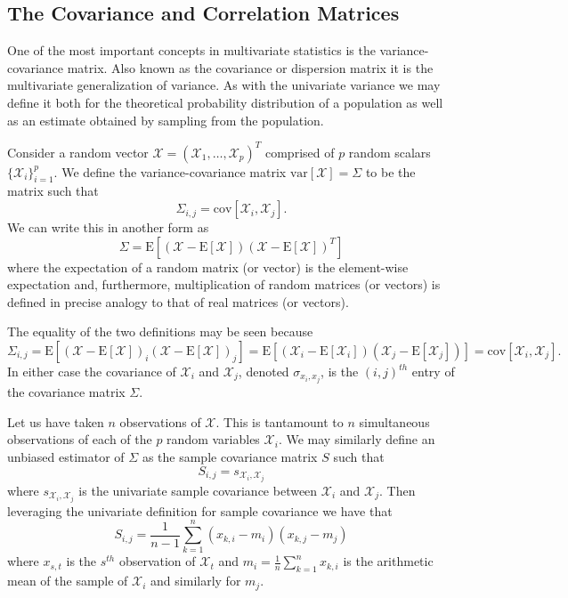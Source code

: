\documentclass{book}
\newcommand{\bs}[1]{\boldsymbol{#1}}
\newcommand{\rv}[1]{\bs{\mathscr{#1}}}
\newcommand{\e}[1]{\text{E}\left[#1\right]}
\newcommand{\cov}[2]{\text{cov}\left[#1,#2\right]}
\begin{document}
\subsection{The Covariance and Correlation Matrices}

One of the most important concepts in multivariate statistics is the variance-covariance matrix. Also known as the covariance or dispersion matrix it is the multivariate generalization of variance. As with the univariate variance we may define it both for the theoretical probability distribution of a population as well as an estimate obtained by sampling from the population. 

Consider a random vector $\bs{\mathscr{X}}=(\mathscr{X}_1,\ldots,\mathscr{X}_p)^T$ comprised of $p$ random scalars $\{\mathscr{X}_i\}_{i=1}^{p}$. We define the variance-covariance matrix $\text{var}\left[\rv{X}\right]=\Sigma$ to be the matrix such that
$$
\Sigma_{i,j}=\text{cov}[\mathscr{X}_i,\mathscr{X}_j].
$$
We can write this in another form as
$$
\Sigma=\text{E}[(\bs{\mathscr{X}}-\text{E}[\bs{\mathscr{X}}])(\bs{\mathscr{X}}-\text{E}[\bs{\mathscr{X}}])^T]
$$
where the expectation of a random matrix (or vector) is the element-wise expectation and, furthermore, multiplication of random matrices (or vectors) is defined in precise analogy to that of real matrices (or vectors). 

The equality of the two definitions may be seen because
$$
\Sigma_{i,j}=\e{(\rv{X}-\e{\rv{X}})_i(\rv{X}-\e{\rv{X}})_j}=\e{(\mathscr{X}_i-\e{\mathscr{X}_i})(\mathscr{X}_j-\e{\mathscr{X}_j})}=\cov{\mathscr{X}_i}{\mathscr{X}_j}.
$$
In either case the covariance of $\mathscr{X}_i$ and $\mathscr{X}_j$, denoted $\sigma_{x_i,x_j}$, is the $(i,j)^{th}$ entry of the covariance matrix $\Sigma$. 

Let us have taken $n$ observations of $\rv{X}$. This is tantamount to $n$ simultaneous observations of each of the $p$ random variables $\mathscr{X}_i$. We may similarly define an unbiased estimator of $\Sigma$ as the sample covariance matrix $S$ such that 
$$
S_{i,j}=s_{\mathscr{X}_i,\mathscr{X}_j}
$$
where $s_{\mathscr{X}_i,\mathscr{X}_j}$ is the univariate sample covariance between $\mathscr{X}_i$ and $\mathscr{X}_j$. Then leveraging the univariate definition for sample covariance we have that 
$$
S_{i,j}=\frac{1}{n-1}\sum_{k=1}^{n}(x_{k,i}-m_i)(x_{k,j}-m_j)
$$
where $x_{s,t}$ is the $s^{th}$ observation of $\mathscr{X}_t$ and $m_i=\frac{1}{n}\sum_{k=1}^{n}x_{k,i}$ is the arithmetic mean of the sample of $\mathscr{X}_i$ and similarly for $m_j$. 
\end{document}
